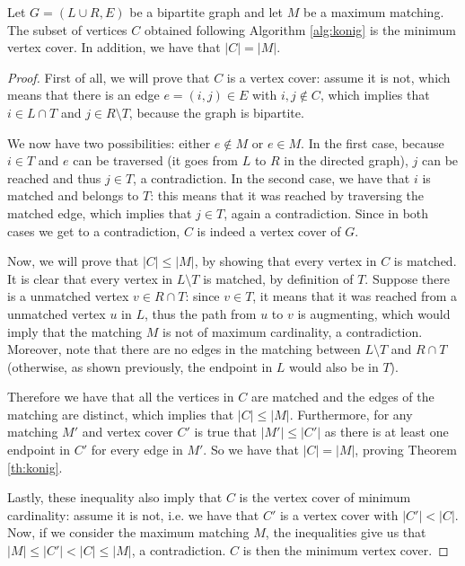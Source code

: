 \begin{lemma}
	Let $G=(L\cup R,E)$ be a bipartite graph and let $M$ be a maximum matching. The subset of vertices $C$ obtained following Algorithm \ref{alg:konig} is the minimum vertex cover. In addition, we have that $|C| = |M|$.
\end{lemma}
\begin{proof}
First of all, we will prove that $C$ is a vertex cover: assume it is not, which means that there is an edge $e = (i,j) \in E$ with $i,j \notin C$, which implies that $i \in L \cap T$ and $j \in R \setminus T$, because the graph is bipartite. 
	
We now have two possibilities: either $e \notin M$ or $e \in M$.  In the first case, because $i \in T$ and $e$ can be traversed (it goes from $L$ to $R$ in the directed graph), $j$ can be reached and thus $j \in T$, a contradiction. In the second case, we have that $i$ is matched and belongs to $T$: this means that it was reached by traversing the matched edge, which implies that $j \in T$, again a contradiction. Since in both cases we get to a contradiction, $C$ is indeed a vertex cover of $G$.

Now, we will prove that $|C| \leq |M|$, by showing that every vertex in $C$ is matched. It is clear that every vertex in $L \setminus T$ is matched, by definition of $T$. Suppose there is a unmatched vertex $v \in R \cap T$: since $v \in T$, it means that it was reached from a unmatched vertex $u$ in $L$, thus the path from $u$ to $v$ is augmenting, which would imply that the matching $M$ is not of maximum cardinality, a contradiction. Moreover, note that there are no edges in the matching between $L \setminus T$ and $R \cap T$ (otherwise, as shown previously, the endpoint in $L$ would also be in $T$).

Therefore we have that all the vertices in $C$ are matched and the edges of the matching are distinct, which implies that $|C| \leq |M|$. Furthermore, for any matching $M'$ and vertex cover $C'$ is true that $|M'| \leq |C'|$ as there is at least one endpoint in $C'$ for every edge in $M'$. So we have that $|C| = |M|$, proving Theorem \ref{th:konig}.

Lastly, these inequality also imply that $C$ is the vertex cover of minimum cardinality: assume it is not, i.e. we have that $C'$ is a vertex cover with $|C'| < |C|$. Now, if we consider the maximum matching $M$, the inequalities give us that $|M| \leq |C'| < |C| \leq |M|$, a contradiction. $C$ is then the minimum vertex cover.

\end{proof}



